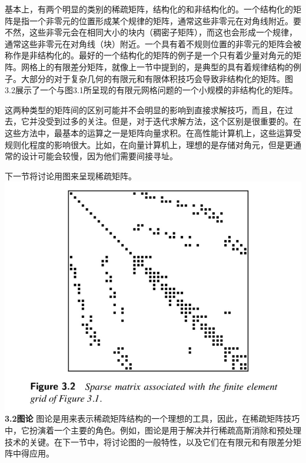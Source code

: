 \documentclass{article}
\begin{document}
基本上，有两个明显的类别的稀疏矩阵，结构化的和非结构化的。一个结构化的矩阵是指一个非零元的位置形成某个规律的矩阵，通常这些非零元在对角线附近。要不然，这些非零元会在相同大小的块内（稠密子矩阵），而这也会形成一个规律，通常这些非零元在对角线（块）附近。一个具有着不规则位置的非零元的矩阵会被称作是非结构化的。最好的一个结构化的矩阵的例子是一个只有着少量对角元的矩阵。网格上的有限差分矩阵，就像上一节中提到的，是典型的具有着规律结构的例子。大部分的对于复杂几何的有限元和有限体积技巧会导致非结构化的矩阵。图3.2展示了一个与图3.1所呈现的有限元网格问题的一个小规模的非结构化的矩阵。
\newline

这两种类型的矩阵间的区别可能并不会明显的影响到直接求解技巧，而且，在过去，它并没受到过多的关注。但是，对于迭代求解方法，这个区别是很重要的。在这些方法中，最基本的运算之一是矩阵向量求积。在高性能计算机上，这些运算受规则化程度的影响很大。比如，在向量计算机上，理想的是存储对角元，但是更通常的设计可能会较慢，因为他们需要间接寻址。
\newline

下一节将讨论用图来呈现稀疏矩阵。
\newline\newline\newline\newline\newline\newline
\includegraphics[scale=0.4]{3_2.png}
\newline\newline
\textbf{3.2图论}
\newline
图论是用来表示稀疏矩阵结构的一个理想的工具，因此，在稀疏矩阵技巧中，它扮演着一个主要的角色。例如，图论是用于解决并行稀疏高斯消除和预处理技术的关键。在下一节中，将讨论图的一般特性，以及它们在有限元和有限差分矩阵中得应用。
\end{document}
